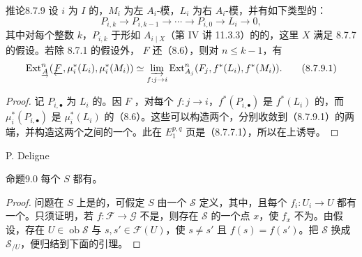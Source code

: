 \begin{SGAresult}{推论}{8.7.9}
设 $i$ 为 $I$ 的，$M_i$ 为左 $A_i$-模，$L_i$ 为右 $A_i$-模，并有如下类型的：
\[
 P_{i,k}\longrightarrow P_{i,k-1}\longrightarrow\cdots\longrightarrow P_{i,0}
 \longrightarrow L_i\longrightarrow0,
\]
其中对每个整数 $k$，$P_{i,k}$ 于形如 $A_{i\mid X}$（第 IV 讲 11.3.3）的的，这里 $X$ 满足 8.7.7 的假设。若除 8.7.1 的假设外， $F$ 还（8.6），则对 $n\leq k-1$，有
\[
 \operatorname{Ext}_{\underrightarrow A}^n(\underleftarrow F,\mu_i^*(L_i),\mu_i^*(M_i))
 \simeq\varinjlim_{f:j\to i}\operatorname{Ext}_{A_j}^n(F_j,f^*(L_i),f^*(M_i)).
 \tag{8.7.9.1}
\]
\end{SGAresult}
\begin{proof}
记 $P_{i,\bullet}$ 为 $L_i$ 的。因 $F$ ，对每个 $f:j\to i$，$f^*(P_{i,\bullet})$ 是 $f^*(L_i)$ 的，而 $\mu_i^*(P_{i,\bullet})$ 是 $\mu_i^*(L_i)$ 的（8.6）。这些可以构造两个，分别收敛到（8.7.9.1）的两端，并构造这两个之间的一个。此在 $E_1^{p,q}$ 页是（8.7.7.1），所以在上诱导。
\end{proof}

\begin{center}P. Deligne\end{center}
\begin{SGAresult}{命题}{9.0}
每个 $S$ 都有。
\end{SGAresult}
\begin{proof}
问题在 $S$ 上是的，可假定 $S$ 由一个 $\mathscr S$ 定义，其中，且每个 $f_i:U_i\to U$ 都有一个。只须证明，若 $f:\mathscr F\to\mathscr G$ 不是，则存在 $\mathscr S$ 的一个点 $x$，使 $f_x$ 不为。由假设，存在 $U\in\operatorname{ob}\mathscr S$ 与 $s,s'\in\mathscr F(U)$，使 $s\ne s'$ 且 $f(s)=f(s')$。把 $\mathscr S$ 换成 $\mathscr S_{/U}$，便归结到下面的引理。
\end{proof}

